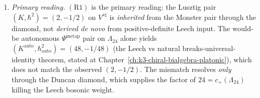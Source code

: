 \begin{theorem}
\begin{enumerate}[label=\textup{(\arabic*)}]
{$(\mathrm{R1})$.}
The metaplectic reading is not independent of the Monster + diamond
reading: there is a factorisation
\[
 \Psi^{\mathrm{metap}}(\Lambda_{24},\,
 \theta_{\Lambda_{24}}/\eta^{24})
 \;\cong\;
 \bigl(\mathrm{diamond}_{\mathrm{Duncan}}\circ
 \Psi(\mathrm{II}_{1,1},\, j(\sigma)-j(\tau))\bigr)^{\mathbb{Z}/2\text{-}\mathrm{super}},
\]
valid on the Baily--Borel zero-cusp of the Siegel
compactification (where $\Psi$ and $\Psi^{\mathrm{metap}}$
differ by precisely the metaplectic twist pinned by the
order-$2$ character of $\widetilde{\mathrm{SL}}_2(\mathbb{Z})$).
In particular, $(\mathrm{R2})$ cannot be evaluated without first
invoking the Duncan diamond; the metaplectic branch is a
\emph{re-packaging} of $\bigl(\mathrm{R1}) + \mathrm{twist}\bigr)$,
not an independent sibling. Consequently, the Conway datum does
\emph{not} constitute a fifth $\Psi$-image row in the
strict ratio-of-levels sense of
Conjecture~\ref{thm:bkm-enriques-psi-landscape}.
\item \emph{Primary reading.}
$(\mathrm{R1})$ is the primary reading:
the Lusztig pair $(K,\hbar^2) = (2,-1/2)$ on $V^{s\natural}$ is
\emph{inherited} from the Monster pair through the diamond, not
\emph{derived de novo} from positive-definite Leech input.
The would-be autonomous $\Psi^{\mathrm{metap}}$ pair on
$\Lambda_{24}$ alone yields
$(K^{\mathrm{auto}},\hbar^2_{\mathrm{auto}}) = (48,-1/48)$
\textup{(}the Leech vs natural breaks-universal-identity theorem,
stated at
Chapter~\ref{ch:k3-chiral-bialgebra-platonic}\textup{)},
which does not match the observed $(2,-1/2)$.
The mismatch resolves \emph{only} through the Duncan
diamond, which supplies the factor of $24 = c_+(\Lambda_{24})$
killing the Leech bosonic weight.
\end{enumerate}
\end{theorem}

